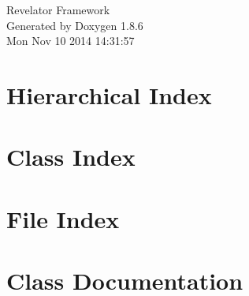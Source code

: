 \documentclass[twoside]{book}
\newcommand{\clearemptydoublepage}{%
  \newpage{\pagestyle{empty}\cleardoublepage}%
}
\begin{document}
\hypersetup{pageanchor=false}
\begin{titlepage}
\vspace*{7cm}
\begin{center}%
{\Large Revelator Framework }\\
\vspace*{1cm}
{\large Generated by Doxygen 1.8.6}\\
\vspace*{0.5cm}
{\small Mon Nov 10 2014 14:31:57}\\
\end{center}
\end{titlepage}
\clearemptydoublepage
\tableofcontents
\clearemptydoublepage
{}
\hypersetup{pageanchor=true}

\chapter{Hierarchical Index}

\chapter{Class Index}

\chapter{File Index}

\chapter{Class Documentation}





















\end{document}
